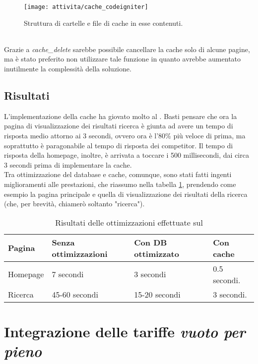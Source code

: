 \begin{figure}[!h] 
	\centering 
	\texttt{[image: attivita/cache\_codeigniter]} 
	\caption{Struttura di cartelle e file di cache in esse contenuti.}
	\label{figura:cache-cartelle}
\end{figure}
\\
Grazie a \textit{cache\_delete} sarebbe possibile cancellare la cache solo di alcune pagine, ma è stato preferito non utilizzare tale funzione in quanto avrebbe aumentato inutilmente la complessità della soluzione.

\subsection{Risultati}
L'implementazione della cache ha giovato molto al \bookingEngine. Basti pensare che ora la pagina di visualizzazione dei risultati ricerca è giunta ad avere un tempo di risposta medio attorno ai 3 secondi, ovvero ora è l'80\% più veloce di prima, ma soprattutto è paragonabile al tempo di risposta dei competitor. Il tempo di risposta della homepage, inoltre, è arrivata a toccare i 500 millisecondi, dai circa 3 secondi prima di implementare la cache.\\
Tra ottimizzazione del database e cache, comunque, sono stati fatti ingenti miglioramenti alle prestazioni, che riassumo nella tabella \ref{table:risultati-ottimizzazioni}, prendendo come esempio la pagina principale e quella di visualizzazione dei risultati della ricerca (che, per brevità, chiamerò soltanto "ricerca").\\

\begin{table}[!h]
	\def\arraystretch{1.5}
	\begin{tabular}{ | l | l | l | l |}
		\hline
		\textbf{Pagina} & \textbf{Senza ottimizzazioni} & \textbf{Con DB ottimizzato} & \textbf{Con cache} \\ \hline
		Homepage & 7 secondi & 3 secondi & 0.5 secondi.  \\
		\hline
		Ricerca & 45-60 secondi & 15-20 secondi & 3 secondi.  \\
		\hline
	\end{tabular}
	\caption{Risultati delle ottimizzazioni effettuate sul \bookingEngine}
	\label{table:risultati-ottimizzazioni}
\end{table}


\newpage
\section{Integrazione delle tariffe \textit{vuoto per pieno}}
